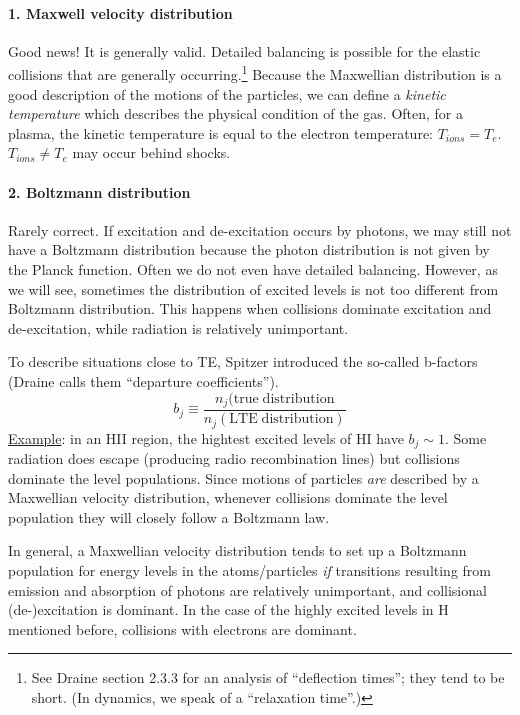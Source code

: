 \documentclass[11pt]{article}
\newcommand{\mar}[1]{\hspace{0pt}\marginpar{-\textcolor{black}{#1}-}}
\begin{document}
\paragraph{1. Maxwell velocity distribution}
Good news! It is generally
valid. Detailed balancing is possible for the elastic collisions that are
generally occurring.\footnote{
    See Draine section 2.3.3 for an analysis of ``deflection times''; they
    tend to be short. (In dynamics, we speak of a ``relaxation time''.)}
Because the Maxwellian distribution is a good
description of the motions of the particles, we can define a \textit{kinetic
temperature} which describes the physical condition of the gas. Often,
for a plasma, the kinetic temperature is equal to the electron temperature:
$T_{ions} = T_{e}$. $T_{ions} \neq T_{e}$ may occur behind shocks.

\paragraph{2. Boltzmann distribution}
\mar{21}Rarely correct.
If excitation and de-excitation occurs by photons, we may still not have a
Boltzmann distribution because the photon distribution is not given by the
Planck function. Often we do not even have detailed balancing.
However, as we will see, sometimes the distribution of excited levels
is not too different from Boltzmann distribution. This happens when collisions
dominate excitation and de-excitation, while radiation is relatively unimportant.

To describe situations close to TE, Spitzer introduced the so-called
b-factors (Draine calls them ``departure coefficients'').
\[
    b_{j} \equiv
    \frac{n_{j}(\mathrm{true\; distribution}}{n_{j}(\mathrm{LTE\; distribution})}
    \]
\underline{Example}: in an HII region, the hightest excited levels of HI have
$b_{j} \sim 1$. Some radiation does escape (producing radio recombination
lines) but collisions dominate the level populations. Since motions of
particles \emph{are} described by a Maxwellian velocity distribution, whenever
collisions dominate the level population they will closely follow a Boltzmann
law.

\mar{22}In general, a Maxwellian velocity distribution tends to set up a
Boltzmann population for energy levels in the atoms/particles \emph{if}
transitions resulting from emission and absorption of photons are
relatively unimportant, and collisional (de-)excitation is dominant. In the
case of the highly excited levels in H mentioned before, collisions with
electrons are dominant.
\end{document}
